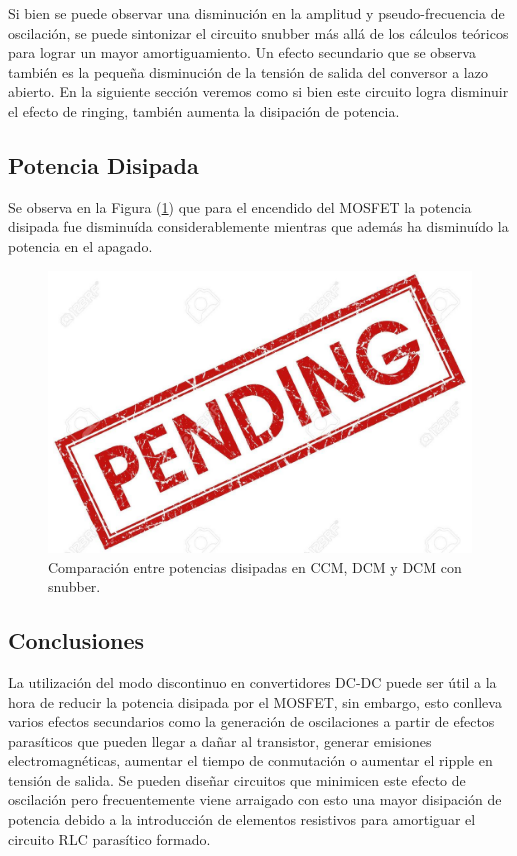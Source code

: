 Si bien se puede observar una disminución en la amplitud y pseudo-frecuencia de oscilación, se puede sintonizar el circuito snubber más allá de los cálculos teóricos para lograr un mayor amortiguamiento. Un efecto secundario que se observa también es la pequeña disminución de la tensión de salida del conversor a lazo abierto. En la siguiente sección veremos como si bien este circuito logra disminuir el efecto de ringing, también aumenta la disipación de potencia.

\subsection{Potencia Disipada}

Se observa en la Figura (\ref{ej4:fig:pots}) que para el encendido del MOSFET la potencia disipada fue disminuída considerablemente mientras que además ha disminuído la potencia en el apagado.

\begin{figure}[H]
	\centering
	\includegraphics[width=0.9\linewidth]{ImagenesEjercicio-4/pend}%
	\caption{Comparación entre potencias disipadas en CCM, DCM y DCM con snubber.}
	\label{ej4:fig:pots}
\end{figure}


\subsection{Conclusiones}
La utilización del modo discontinuo en convertidores DC-DC puede ser útil a la hora de reducir la potencia disipada por el MOSFET, sin embargo, esto conlleva varios efectos secundarios como la generación de oscilaciones a partir de efectos parasíticos que pueden llegar a dañar al transistor, generar emisiones electromagnéticas, aumentar el tiempo de conmutación o aumentar el ripple en tensión de salida. Se pueden diseñar circuitos que minimicen este efecto de oscilación pero frecuentemente viene arraigado con esto una mayor disipación de potencia debido a la introducción de elementos resistivos para amortiguar el circuito RLC parasítico formado.

